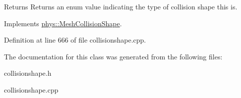 \begin{DoxyReturn}{Returns}
Returns an enum value indicating the type of collision shape this is. 
\end{DoxyReturn}
 

Implements \hyperlink{classphys_1_1MeshCollisionShape_abc9d3f06df71eadb59ba93eadf6ab82f}{phys::MeshCollisionShape}.



Definition at line 666 of file collisionshape.cpp.



The documentation for this class was generated from the following files:\begin{DoxyCompactItemize}
\item 
collisionshape.h\item 
collisionshape.cpp\end{DoxyCompactItemize}
